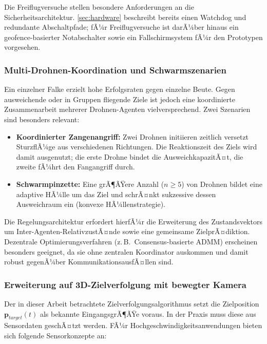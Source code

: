 ﻿\documentclass[12pt,a4paper]{article}
\theoremstyle{remark}
\begin{document}
	Die Freiflugversuche stellen besondere Anforderungen an die Sicherheitsarchitektur. \cref{sec:hardware} beschreibt bereits einen Watchdog und redundante Abschaltpfade; fÃ¼r Freiflugversuche ist darÃ¼ber hinaus ein geofence-basierter Notabschalter sowie ein Fallschirmsystem fÃ¼r den Prototypen vorgesehen.

	\subsubsection{Multi-Drohnen-Koordination und Schwarmszenarien}

	Ein einzelner Falke erzielt hohe Erfolgsraten gegen einzelne Beute. Gegen ausweichende oder in Gruppen fliegende Ziele ist jedoch eine koordinierte Zusammenarbeit mehrerer Drohnen-Agenten vielversprechend. Zwei Szenarien sind besonders relevant:

	\begin{itemize}
		\item \textbf{Koordinierter Zangenangriff:} Zwei Drohnen initiieren zeitlich versetzt SturzflÃ¼ge aus verschiedenen Richtungen. Die Reaktionszeit des Ziels wird damit ausgenutzt; die erste Drohne bindet die AusweichkapazitÃ¤t, die zweite fÃ¼hrt den Fangangriff durch.
		\item \textbf{Schwarmpinzette:} Eine grÃ¶ÃŸere Anzahl ($n \geq 5$) von Drohnen bildet eine adaptive HÃ¼lle um das Ziel und schrÃ¤nkt sukzessive dessen Ausweichraum ein (konvexe HÃ¼llenstrategie).
	\end{itemize}

	Die Regelungsarchitektur erfordert hierfÃ¼r die Erweiterung des Zustandsvektors um Inter-Agenten-RelativzustÃ¤nde sowie eine gemeinsame ZielprÃ¤diktion. Dezentrale Optimierungsverfahren (z.\,B.\ Consensus-basierte ADMM) erscheinen besonders geeignet, da sie ohne zentralen Koordinator auskommen und damit robust gegenÃ¼ber KommunikationsausfÃ¤llen sind.

	\subsubsection{Erweiterung auf 3D-Zielverfolgung mit bewegter Kamera}

	Der in dieser Arbeit betrachtete Zielverfolgungsalgorithmus setzt die Zielposition $\mathbf{p}_{target}(t)$ als bekannte EingangsgrÃ¶ÃŸe voraus. In der Praxis muss diese aus Sensordaten geschÃ¤tzt werden. FÃ¼r Hochgeschwindigkeitsanwendungen bieten sich folgende Sensorkonzepte an:
\end{document}
